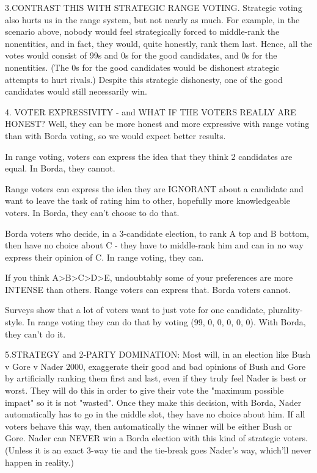 3.CONTRAST THIS WITH STRATEGIC RANGE VOTING.
Strategic voting also hurts us in the range system, but not nearly as much.  For example,
in the scenario above, nobody would feel strategically forced to middle-rank the nonentities, 
and in fact, they would, quite honestly, rank them last.  Hence, all the votes would
consist of 99s and 0s for the good candidates, and 0s for the nonentities.
(The 0s for the good candidates would be dishonest strategic attempts to hurt
rivals.)  Despite this strategic dishonesty, one of the good candidates
would still necessarily win.


4. VOTER EXPRESSIVITY - and WHAT IF THE VOTERS REALLY ARE HONEST?
Well,  they can be more honest and more expressive with range voting than with 
Borda voting, so we would expect better results.

In range voting, voters can express the idea that they think 2 candidates are equal.
In Borda, they cannot. 

Range voters can express the idea they are IGNORANT about a candidate and want to leave the
task of rating him to other, hopefully more knowledgeable voters.  In Borda, they
can't choose to do that.

Borda voters who decide, in a 3-candidate election, to rank A top and B bottom,
then have no choice about C - they have to middle-rank him and can in no way express
their opinion of C.   In range voting, they can.

If you think  A>B>C>D>E,  undoubtably some of your preferences are more INTENSE 
than others.    Range voters can express that.  Borda voters cannot.

Surveys show that a lot of voters want to just vote for one candidate, plurality-style.
In range voting they can do that by voting (99, 0, 0, 0, 0, 0).
With Borda, they can't do it.


5.STRATEGY and 2-PARTY DOMINATION:
Most will, in an election like Bush v Gore v Nader 2000,
exaggerate their good and bad opinions of Bush and Gore by artificially ranking
them first and last, even if they truly feel Nader is best or worst.
They will do this in order to give their vote the "maximum possible impact"
so it is not "wasted".  Once they make this decision, with Borda,  Nader automatically
has to go in the middle slot, they have no choice about him.  If all
voters behave this way, then automatically the winner will be either
Bush or Gore.  Nader can NEVER win a Borda election with this kind of strategic voters.
(Unless it is an exact 3-way tie and the tie-break goes Nader's way,
which'll never happen in reality.)

